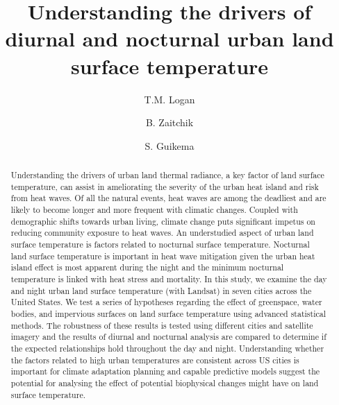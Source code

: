\documentclass[]{elsarticle}
\begin{document}
\begin{frontmatter}

\title{Understanding the drivers of diurnal and nocturnal urban land surface temperature}

\author[1]{T.M. Logan}

\author[2]{B. Zaitchik}
\author[1]{S. Guikema}


\address[1]{Industrial and Operations Engineering, University of Michigan, Ann Arbor, MI}
\address[2]{Earth and Planetary Sciences, Johns Hopkins University, Baltimore, MD}

\begin{abstract}
Understanding the drivers of urban land thermal radiance, a key factor of land surface temperature, can assist in ameliorating the severity of the urban heat island and risk from heat waves. Of all the natural events, heat waves are among the deadliest and are likely to become longer and more frequent with climatic changes. Coupled with demographic shifts towards urban living, climate change puts significant impetus on reducing community exposure to heat waves. An understudied aspect of urban land surface temperature is factors related to nocturnal surface temperature. Nocturnal land surface temperature is important in heat wave mitigation given the urban heat island effect is most apparent during the night and the minimum nocturnal temperature is linked with heat stress and mortality. In this study, we examine the day and night urban land surface temperature (with Landsat) in seven cities across the United States. We test a series of hypotheses regarding the effect of greenspace, water bodies, and impervious surfaces on land surface temperature using advanced statistical methods. The robustness of these results is tested using different cities and satellite imagery and the results of diurnal and nocturnal analysis are compared to determine if the expected relationships hold throughout the day and night. Understanding whether the factors related to high urban temperatures are consistent across US cities is important for climate adaptation planning and capable predictive models suggest the potential for analysing the effect of potential biophysical changes might have on land surface temperature.
\end{abstract}

\begin{keyword}

\end{keyword}

\end{frontmatter}
\end{document}
